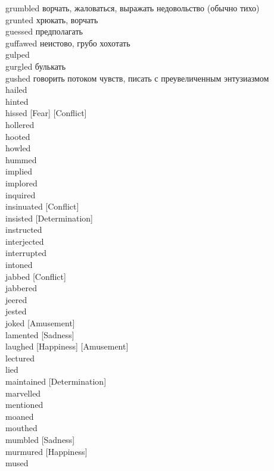 \documentclass[a4paper,12pt,fleqn]{book}\usepackage{polyglossia}\setdefaultlanguage[babelshorthands=true]{russian}\setotherlanguage{english}\defaultfontfeatures{Ligatures=TeX,Mapping=tex-text}\usepackage{xcolor}\newcommand{\ml}[3]{#2}
\begin{document}
{grumbled \hfill ворчать, жаловаться, выражать недовольство (обычно тихо)\\
grunted \hfill хрюкать, ворчать\\
guessed \hfill предполагать\\
guffawed \hfill неистово, грубо хохотать\\
gulped \hfill \\
gurgled \hfill булькать\\
gushed \hfill говорить потоком чувств, писать с преувеличенным энтузиазмом\\
hailed \hfill \\
hinted \hfill \\
hissed [Fear] [Conflict] \hfill \\
hollered \hfill \\
hooted \hfill \\
howled \hfill \\
hummed \hfill \\
implied \hfill \\
implored \hfill \\
inquired \hfill \\
insinuated [Conflict] \hfill \\
insisted [Determination] \hfill \\
instructed \hfill \\
interjected \hfill \\
interrupted \hfill \\
intoned \hfill \\
jabbed [Conflict] \hfill \\
jabbered \hfill \\
jeered \hfill \\
jested \hfill \\
joked [Amusement] \hfill \\
lamented [Sadness] \hfill \\
laughed [Happiness] [Amusement] \hfill \\
lectured \hfill \\
lied \hfill \\
maintained [Determination] \hfill \\
marvelled \hfill \\
mentioned \hfill \\
moaned \hfill \\
mouthed \hfill \\
mumbled [Sadness] \hfill \\
murmured [Happiness] \hfill \\
mused \hfill \\
}
\end{document}
